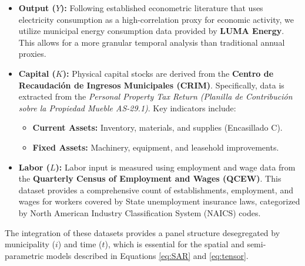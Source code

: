 \begin{itemize}
	\item \textbf{Output ($Y$):} Following established econometric literature that uses electricity
	      consumption as a high-correlation proxy for economic activity, we utilize municipal energy
	      consumption data provided by \textbf{LUMA Energy}. This allows for a more granular temporal
	      analysis than traditional annual proxies.

	\item \textbf{Capital ($K$):} Physical capital stocks are derived from the
	      \textbf{Centro de Recaudación de Ingresos Municipales (CRIM)}. Specifically,
	      data is extracted from the \textit{Personal Property Tax Return (Planilla de Contribución sobre la Propiedad Mueble AS-29.1)}. Key indicators include:
	      \begin{itemize}
		      \item \textbf{Current Assets:} Inventory, materials, and supplies (Encasillado C).
		      \item \textbf{Fixed Assets:} Machinery, equipment, and leasehold improvements.
	      \end{itemize}

	\item \textbf{Labor ($L$):} Labor input is measured using employment and wage data from the
	      \textbf{Quarterly Census of Employment and Wages (QCEW)}. This dataset provides a comprehensive count of
	      establishments, employment, and wages for workers covered by State unemployment insurance laws, categorized
	      by North American Industry Classification System (NAICS) codes.
\end{itemize}

The integration of these datasets provides a panel structure desegregated by municipality ($i$) and time ($t$), which is essential
for the spatial and semi-parametric models described in Equations \ref{eq:SAR} and \ref{eq:tensor}.
